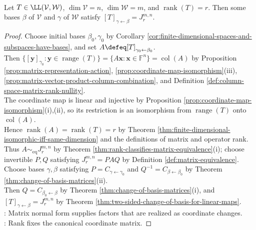 \begin{corollary} \label{cor:linear-map-rank-normal-form} \\
Let $T\in\LL(\mathcal{V},\mathcal{W})$, $\dim\mathcal{V}=n$, $\dim\mathcal{W}=m$, and $\operatorname{rank}(T)=r$. Then some bases $\beta$ of $\mathcal{V}$ and $\gamma$ of $\mathcal{W}$ satisfy $[T]_{\gamma\leftarrow\beta}=J_r^{m,n}$.
\begin{proof}
Choose initial bases $\beta_0,\gamma_0$ by Corollary \ref{cor:finite-dimensional-spaces-and-subspaces-have-bases}, and set $A\defeq[T]_{\gamma_0\leftarrow\beta_0}$.\\
Then $\{[\mathbf{y}]_{\gamma_0}:\mathbf{y}\in\operatorname{range}(T)\}=\{A\mathbf{x}:\mathbf{x}\in\mathbb{F}^n\}=\operatorname{col}(A)$ by Proposition \ref{prop:matrix-representation-action}, \ref{prop:coordinate-map-isomorphism}(iii), \ref{prop:matrix-vector-product-column-combination}, and Definition \ref{def:column-space-matrix-rank-nullity}.\\
The coordinate map is linear and injective by Proposition \ref{prop:coordinate-map-isomorphism}(i),(ii), so its restriction is an isomorphism from $\operatorname{range}(T)$ onto $\operatorname{col}(A)$.\\
Hence $\operatorname{rank}(A)=\operatorname{rank}(T)=r$ by Theorem \ref{thm:finite-dimensional-isomorphic-iff-same-dimension} and the definitions of matrix and operator rank.\\
Thus $A\sim_{\mathrm{eq}}J_r^{m,n}$ by Theorem \ref{thm:rank-classifies-matrix-equivalence}(i); choose invertible $P,Q$ satisfying $J_r^{m,n}=PAQ$ by Definition \ref{def:matrix-equivalence}.\\
Choose bases $\gamma,\beta$ satisfying $P=C_{\gamma\leftarrow\gamma_0}$ and $Q^{-1}=C_{\beta\leftarrow\beta_0}$ by Theorem \ref{thm:change-of-basis-matrices}(ii).\\
Then $Q=C_{\beta_0\leftarrow\beta}$ by Theorem \ref{thm:change-of-basis-matrices}(i), and $[T]_{\gamma\leftarrow\beta}=J_r^{m,n}$ by Theorem \ref{thm:two-sided-change-of-basis-for-linear-maps}.\\
: Matrix normal form supplies factors that are realized as coordinate changes.\\
: Rank fixes the canonical coordinate matrix.
\end{proof}
\end{corollary}

